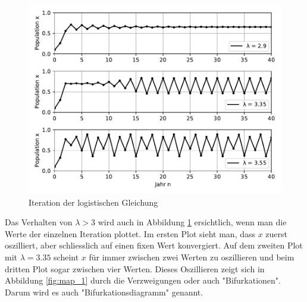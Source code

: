 \begin{figure}
    \includegraphics[width=\linewidth]{papers/logistic/figures/pop_logistic_2.pdf}
    \caption{Iteration der logistischen Gleichung}
    \label{fig:pop_logistic_2}
\end{figure}

Das Verhalten von $\lambda > 3$ wird auch in Abbildung 
\ref{fig:pop_logistic_2} ersichtlich,
wenn man die Werte der einzelnen Iteration plottet.
Im ersten Plot sieht man, dass $x$ zuerst oszilliert,
aber schliesslich auf einen fixen Wert konvergiert.
Auf dem zweiten Plot mit $\lambda = 3.35$ scheint $x$ 
für immer zwischen zwei Werten zu oszillieren und beim
dritten Plot sogar zwischen vier Werten. 
Dieses Oszillieren zeigt sich in Abbildung \ref{fig:map_1}
durch die Verzweigungen oder auch "Bifurkationen". 
Darum wird es auch "Bifurkationsdiagramm" genannt. 

